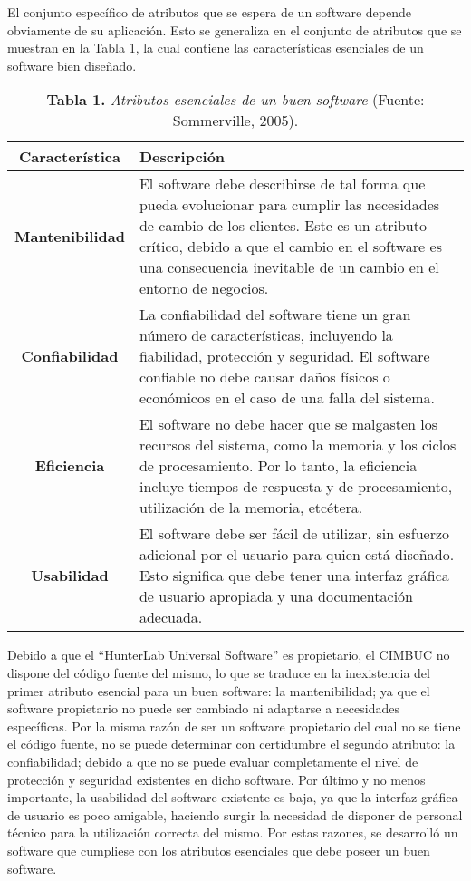 El conjunto espec\'{i}fico de atributos que se espera de un software depende obviamente de su aplicaci\'{o}n. Esto se generaliza en el conjunto de atributos que se muestran en la Tabla 1, la cual contiene las caracter\'{i}sticas esenciales de un software bien dise\~{n}ado.

	\begin{table}[htb]
		\small
		\centering
		\setlength{\extrarowheight}{5pt}
		\begin{tabulary}{15cm}{|c|L|}
			\hline
			\textbf{Caracter\'{i}stica} & \textbf{Descripci\'{o}n}\\ \hline
			\textbf{Mantenibilidad} & El software debe describirse de tal forma que pueda evolucionar  para cumplir las necesidades de cambio de los 					clientes. Este es un atributo cr\'{i}tico, debido a que el cambio en el software es una consecuencia inevitable de un cambio en el entorno de negocios.\\ \hline
			\textbf{Confiabilidad} & La confiabilidad del software tiene un gran n\'{u}mero de caracter\'{i}sticas, incluyendo la fiabilidad, protecci\'{o}n y seguridad. El software confiable no debe causar da\~{n}os f\'{i}sicos o econ\'{o}micos en el caso de una falla del sistema.\\ \hline
			\textbf{Eficiencia} & El software no debe hacer que se malgasten los recursos del sistema, como la memoria y los ciclos de procesamiento. Por lo tanto, la eficiencia incluye tiempos de respuesta y de procesamiento, utilizaci\'{o}n de la memoria, etc\'{e}tera.\\ \hline
			\textbf{Usabilidad} & El software debe ser f\'{a}cil de utilizar, sin esfuerzo adicional por el usuario para quien est\'{a} dise\~{n}ado. Esto significa que debe tener una interfaz gr\'{a}fica de usuario apropiada y una documentaci\'{o}n adecuada.\\ \hline
		\end{tabulary}
			\caption{\textbf{Tabla 1.} \textit{Atributos esenciales de un buen software}		(Fuente: Sommerville, 2005).}
	\end{table}
			\FloatBarrier %
Debido a que el ``HunterLab Universal Software'' es propietario, el CIMBUC no dispone del c\'{o}digo fuente del mismo, lo que se traduce en la inexistencia del primer atributo esencial para un buen software: la mantenibilidad; ya que el software propietario no puede ser cambiado ni adaptarse a necesidades espec\'{i}ficas. Por la misma raz\'{o}n de ser un software propietario del cual no se tiene el c\'{o}digo fuente, no se puede determinar con certidumbre el segundo atributo: la confiabilidad; debido a que no se puede evaluar completamente el nivel de protecci\'{o}n y seguridad existentes en dicho software. Por \'{u}ltimo y no menos importante, la usabilidad del software existente es baja, ya que la interfaz gr\'{a}fica de usuario es poco amigable, haciendo surgir la necesidad de disponer de personal t\'{e}cnico para la utilizaci\'{o}n correcta del mismo. Por estas razones, se desarroll\'{o} un software que cumpliese con los atributos esenciales que debe poseer un buen software.

